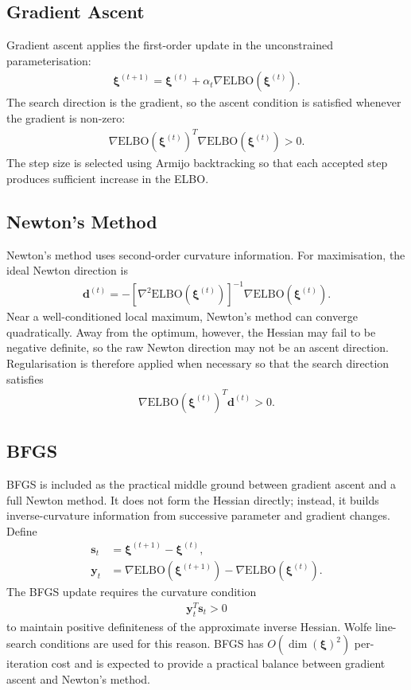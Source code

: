 \documentclass[11pt,a4paper]{article}
\newcommand{\ELBO}{\text{ELBO}}
\begin{document}
\subsection{Gradient Ascent}

Gradient ascent applies the first-order update in the unconstrained parameterisation:
\begin{align}
\bm{\xi}^{(t+1)} = \bm{\xi}^{(t)} + \alpha_t \nabla\ELBO(\bm{\xi}^{(t)}).
\end{align}
The search direction is the gradient, so the ascent condition is satisfied whenever the gradient is non-zero:
\begin{align}
\nabla\ELBO(\bm{\xi}^{(t)})^T \nabla\ELBO(\bm{\xi}^{(t)}) > 0.
\end{align}
The step size is selected using Armijo backtracking so that each accepted step produces sufficient increase in the ELBO.

\subsection{Newton's Method}

Newton's method uses second-order curvature information. For maximisation, the ideal Newton direction is
\begin{align}
\bm{d}^{(t)} = -[\nabla^2\ELBO(\bm{\xi}^{(t)})]^{-1}\nabla\ELBO(\bm{\xi}^{(t)}).
\end{align}
Near a well-conditioned local maximum, Newton's method can converge quadratically. Away from the optimum, however, the Hessian may fail to be negative definite, so the raw Newton direction may not be an ascent direction. Regularisation is therefore applied when necessary so that the search direction satisfies
\begin{align}
\nabla\ELBO(\bm{\xi}^{(t)})^T\bm{d}^{(t)} > 0.
\end{align}

\subsection{BFGS}

BFGS is included as the practical middle ground between gradient ascent and a full Newton method. It does not form the Hessian directly; instead, it builds inverse-curvature information from successive parameter and gradient changes. Define
\begin{align}
\bm{s}_t &= \bm{\xi}^{(t+1)} - \bm{\xi}^{(t)},\\
\bm{y}_t &= \nabla\ELBO(\bm{\xi}^{(t+1)}) - \nabla\ELBO(\bm{\xi}^{(t)}).
\end{align}
The BFGS update requires the curvature condition
\begin{align}
\bm{y}_t^T\bm{s}_t > 0
\end{align}
to maintain positive definiteness of the approximate inverse Hessian. Wolfe line-search conditions are used for this reason. BFGS has $O(\dim(\bm{\xi})^2)$ per-iteration cost and is expected to provide a practical balance between gradient ascent and Newton's method.
\end{document}
